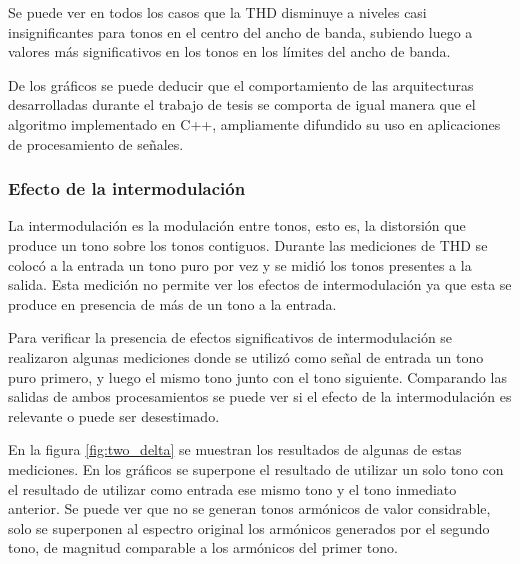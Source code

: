 Se puede ver en todos los casos que la THD disminuye a niveles casi insignificantes para tonos en el
centro del ancho de banda, subiendo luego a valores más significativos en los tonos en los límites
del ancho de banda.

De los gráficos se puede deducir que el comportamiento de las arquitecturas desarrolladas durante el
trabajo de tesis se comporta de igual manera que el algoritmo implementado en C++, ampliamente
difundido su uso en aplicaciones de procesamiento de señales.

\subsubsection{Efecto de la intermodulación}

La intermodulación es la modulación entre tonos, esto es, la distorsión que produce un tono sobre
los tonos contiguos.
Durante las mediciones de THD se colocó a la entrada un tono puro por vez y se midió los tonos
presentes a la salida. Esta medición no permite ver los efectos de intermodulación ya que esta se produce en presencia de más de un tono a la
entrada.

Para verificar la presencia de efectos significativos de intermodulación se realizaron algunas
mediciones donde se utilizó como señal de entrada un tono puro primero, y luego el mismo tono junto con el tono siguiente. Comparando
las salidas de ambos procesamientos se puede ver si el efecto de la intermodulación es relevante o
puede ser desestimado.

En la figura \ref{fig:two_delta} se muestran los resultados de algunas de estas mediciones. En los
gráficos se superpone el resultado de utilizar un solo tono con el resultado de utilizar como
entrada ese mismo tono y el tono inmediato anterior. Se puede ver que no se generan tonos armónicos
de valor considrable, solo se superponen al espectro original los armónicos generados por el segundo
tono, de magnitud comparable a los armónicos del primer tono.

